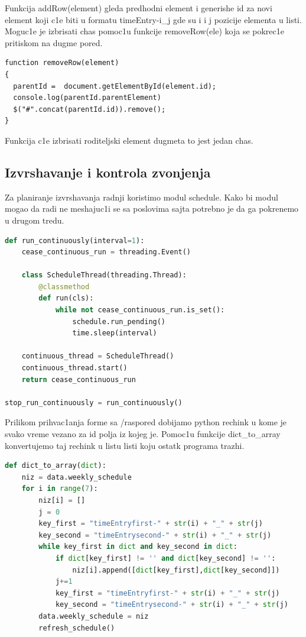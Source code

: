 \documentclass[a4paper,fleqn,12pt]{JMThesis}
\newcommand{\latin}{\fontencoding{T1}\selectfont}
\theoremstyle{plain}
\theoremstyle{definition}
\begin{document}
Funkcija {\latin addRow(element)} gleda predhodni element i generishe id za novi element koji c1e biti u formatu {\latin timeEntry-i\_j } gde su {\latin i} i {\latin j} pozicije elementa u listi. Moguc1e je izbrisati chas pomoc1u funkcije {\latin removeRow(ele)} koja se pokrec1e pritiskom na dugme pored.

{\latin
\begin{center}
\begin{lstlisting}[caption={\latin removeRow(element)}]
function removeRow(element)
{
  parentId =  document.getElementById(element.id);
  console.log(parentId.parentElement)
  $("#".concat(parentId.id)).remove();
}
\end{lstlisting}
\end{center}
}
Funkcija c1e izbrisati roditeljski element dugmeta to jest jedan chas.

\subsection{Izvrshavanje i kontrola zvonjenja}
Za planiranje izvrshavanja radnji koristimo modul {\latin schedule}.
Kako bi modul mogao da radi ne meshajuc1i se sa poslovima sajta potrebno je da ga pokrenemo u drugom tredu.

{\latin
\begin{center}
\begin{lstlisting}[language=Python]
def run_continuously(interval=1):
    cease_continuous_run = threading.Event()

    class ScheduleThread(threading.Thread):
        @classmethod
        def run(cls):
            while not cease_continuous_run.is_set():
                schedule.run_pending()
                time.sleep(interval)

    continuous_thread = ScheduleThread()
    continuous_thread.start()
    return cease_continuous_run

stop_run_continuously = run_continuously()
\end{lstlisting}
\end{center}
}

Prilikom prihvac1anja forme sa {\latin /raspored} dobijamo {\latin python} rechink u kome je svako vreme vezano za id polja iz kojeg je. Pomoc1u funkcije {\latin dict\_to\_array} konvertujemo taj rechink u listu listi koju ostatk programa trazhi.

{\latin
\begin{center}
\begin{lstlisting}[language=Python]
def dict_to_array(dict):
    niz = data.weekly_schedule
    for i in range(7):
        niz[i] = []
        j = 0
        key_first = "timeEntryfirst-" + str(i) + "_" + str(j)
        key_second = "timeEntrysecond-" + str(i) + "_" + str(j)
        while key_first in dict and key_second in dict:
            if dict[key_first] != '' and dict[key_second] != '':
                niz[i].append([dict[key_first],dict[key_second]])
            j+=1
            key_first = "timeEntryfirst-" + str(i) + "_" + str(j)
            key_second = "timeEntrysecond-" + str(i) + "_" + str(j)
        data.weekly_schedule = niz
        refresh_schedule()
\end{lstlisting}
\end{center}
}
\end{document}
